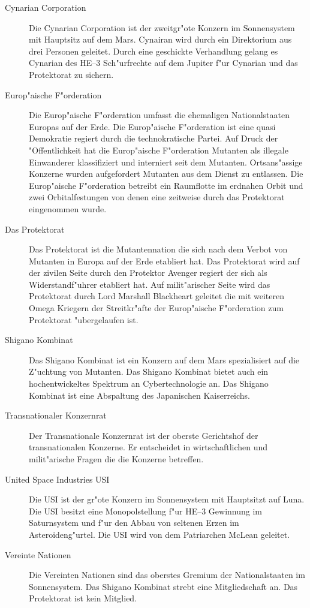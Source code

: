 \begin{appendices}
\begin{description}
\item [Cynarian Corporation] Die Cynarian Corporation ist der zweitgr"o\3te Konzern im Sonnensystem mit Hauptsitz auf
      dem Mars. Cynairan wird durch ein Direktorium aus drei Personen geleitet. Durch eine geschickte Verhandlung gelang es Cynarian des HE--3 Sch"urfrechte auf dem Jupiter f"ur Cynarian und das Protektorat zu sichern.
      \item [Europ"aische F"orderation] Die Europ"aische F"orderation umfasst die ehemaligen Nationalstaaten Europas auf der Erde. Die Europ"aische F"orderation ist eine quasi Demokratie regiert durch die technokratische Partei. Auf Druck der "Offentlichkeit hat die Europ"aische F"orderation Mutanten als illegale Einwanderer klassifiziert und interniert seit dem Mutanten. Ortsans"assige Konzerne wurden aufgefordert Mutanten aus dem Dienst zu entlassen. Die Europ"aische F"orderation betreibt ein Raumflotte im erdnahen Orbit und zwei Orbitalfestungen von denen eine zeitweise durch das Protektorat eingenommen wurde.
\item [Das Protektorat] Das Protektorat ist die Mutantennation die sich nach dem Verbot von Mutanten in Europa
      auf der Erde etabliert hat. Das Protektorat wird auf der zivilen Seite durch den Protektor Avenger regiert der sich als Widerstandf"uhrer etabliert hat. Auf milit"arischer Seite wird das Protektorat durch Lord Marshall Blackheart geleitet die mit weiteren Omega Kriegern der Streitkr"afte der Europ"aische F"orderation zum Protektorat "ubergelaufen ist.
\item [Shigano Kombinat] Das Shigano Kombinat ist ein Konzern auf dem Mars spezialisiert auf die Z"uchtung von
      Mutanten. Das Shigano Kombinat bietet auch ein hochentwickeltes Spektrum an Cybertechnologie an. Das Shigano Kombinat ist eine Abspaltung des Japanischen Kaiserreichs.
\item [Transnationaler Konzernrat] Der Transnationale Konzernrat ist der oberste Gerichtshof der transnationalen
      Konzerne. Er entscheidet in wirtschaftlichen und milit"arische Fragen die die Konzerne betreffen.
\item [United Space Industries USI] Die USI ist der gr"o\3te Konzern im Sonnensystem mit Hauptsitzt auf Luna. Die USI
      besitzt eine Monopolstellung f"ur HE--3 Gewinnung im Saturnsystem und f"ur den Abbau von seltenen Erzen im Asteroideng"urtel. Die USI wird von dem Patriarchen McLean geleitet.
\item [Vereinte Nationen] Die Vereinten Nationen sind das oberstes Gremium der Nationalstaaten im Sonnensystem. Das
      Shigano Kombinat strebt eine Mitgliedschaft an. Das Protektorat ist kein Mitglied.
\end{description}


\end{appendices}
